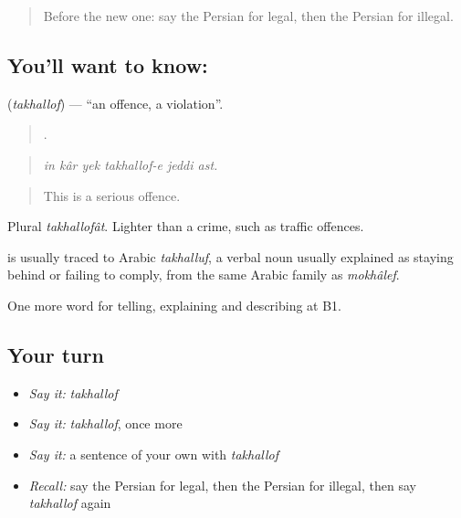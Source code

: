\label{lesson:FA-C405-takhallof}



\begin{quote}
Before the new one: say the Persian for legal, then the Persian for illegal.
\end{quote}

\subsection*{You'll want to know: }
\textbf{} (\emph{takhallof}) — \textquotedblleft{}an offence, a violation\textquotedblright{}.

\begin{quote}
     .
\end{quote}

\begin{quote}
\emph{in kâr yek takhallof-e jeddi ast.}
\end{quote}

\begin{quote}
This is a serious offence.
\end{quote}

Plural \emph{takhallofât}. Lighter than a crime, such as traffic offences.

\begin{cousinweb}
\textbf{} is usually traced to Arabic \emph{takhalluf}, a verbal noun usually explained as staying behind or failing to comply, from the same Arabic family as \emph{mokhâlef}.
\end{cousinweb}

\begin{grammarlens}[title={What you've built}]
One more word for telling, explaining and describing at B1.
\end{grammarlens}

\subsection*{Your turn}
\begin{itemize}
\raggedright
  \item \emph{Say it:} \emph{takhallof}
  \item \emph{Say it:} \emph{takhallof}, once more
  \item \emph{Say it:} a sentence of your own with \emph{takhallof}
  \item \emph{Recall:} say the Persian for legal, then the Persian for illegal, then say \emph{takhallof} again
\end{itemize}

